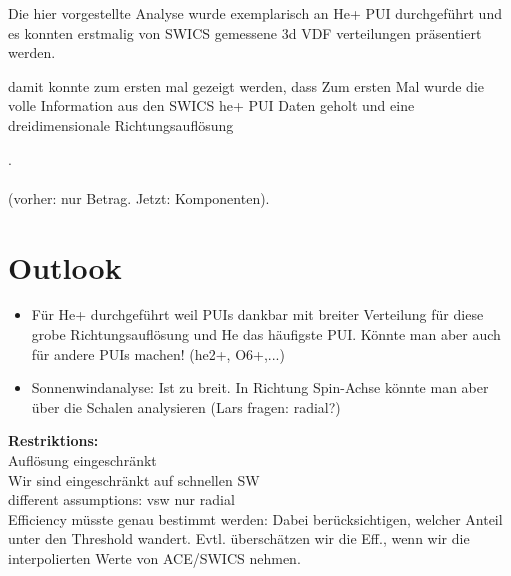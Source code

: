 





Die hier vorgestellte Analyse wurde exemplarisch an He+ PUI durchgeführt und es konnten erstmalig von SWICS gemessene 3d VDF verteilungen präsentiert werden. 

 damit konnte zum ersten mal gezeigt werden, dass 
Zum ersten Mal wurde die volle Information aus den SWICS he+ PUI Daten geholt und eine dreidimensionale Richtungsauflösung 

.
\\ \\
(vorher: nur Betrag. Jetzt: Komponenten).



\section{Outlook}
\begin{itemize}
	\item Für He+ durchgeführt weil PUIs dankbar mit breiter Verteilung für diese grobe Richtungsauflösung und He das häufigste PUI. Könnte man aber auch für andere PUIs machen! (he2+, O6+,...)
	\item Sonnenwindanalyse: Ist zu breit. In Richtung Spin-Achse könnte man aber über die Schalen analysieren (Lars fragen: radial?)
	
	
	
\end{itemize}









\textbf{Restriktions:}\\

Auflösung eingeschränkt\\
Wir sind eingeschränkt auf schnellen SW\\
different assumptions: vsw nur radial\\
Efficiency müsste genau bestimmt werden: Dabei berücksichtigen, welcher Anteil unter den Threshold wandert. Evtl. überschätzen wir die Eff., wenn wir die interpolierten Werte von ACE/SWICS nehmen.










